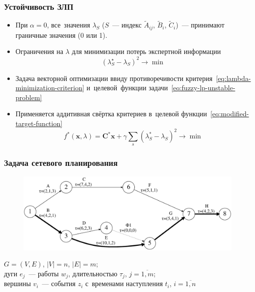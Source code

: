 \documentclass[12pt]{beamer}
\begin{document}
\begin{frame}
  \frametitle{Устойчивость ЗЛП}
  \begin{itemize}
    \item При $\alpha=0$, все~значения $\lambda_S$ ($S$~--- индекс $\tilde A_{ij}$, $\tilde B_i$, $\tilde C_i$)~--- принимают граничные значения (0 или 1). 
    \item Ограничения на $\lambda$ для минимизации потерь экспертной информации
      \begin{equation}
      \label{eq:lambda-minimization-criterion}
        {\left( \lambda_{S}^{\star}-\lambda_S \right)}^2\to \min
      \end{equation}
    \item Задача векторной оптимизации ввиду противоречивости критерия~\eqref{eq:lambda-minimization-criterion} и~целевой~функции задачи~\eqref{eq:fuzzy-lp-unstable-problem}
    \item Применяется аддитивная свёртка критериев в~целевой функции~\eqref{eq:modified-target-function}
      \begin{equation}
      \label{eq:modified-target-function}
        f^{*}\left( \mathbf{x}, \lambda \right)=\mathbf{C}^{*}\mathbf{x}+\gamma \sum\limits_{s}^{}{\left(\lambda_{S}^{*}-\lambda_S \right)}^{2} \to \min
      \end{equation}
  \end{itemize}
\end{frame}


\begin{frame}
  \frametitle{Задача сетевого планирования}
  \begin{figure}
    \center
    \includegraphics[width=\textwidth]{pplan}
  \end{figure}
  $G=(V,E)$, $\left| V \right|=n$, $\left| E \right|=m$; \\
  дуги $e_j$~--- работы $w_j$, длительностью $\tau_j$, $j=\overline{1,m}$; \\
  вершины $v_i$~--- события $z_i$ с~временами наступления $t_i$, $i=\overline{1,n}$
\end{frame}
\end{document}
